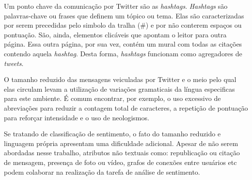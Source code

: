 Um ponto chave da comunicação por Twitter são as \textit{hashtags}.
\textit{Hashtags} são palavras-chave ou frases que definem um tópico ou tema.
Elas são caracterizadas por serem precedidas pelo simbolo da tralha (\#) e por não conterem espaços ou pontuação.
São, ainda, elementos clicáveis que apontam o leitor para outra página.
Essa outra página, por sua vez, contém um mural com todas as citações contendo aquela \textit{hashtag}.
Desta forma, \textit{hashtags} funcionam como agregadores de \textit{tweets}.

O tamanho reduzido das mensagens veiculadas por Twitter e o meio pelo qual elas circulam levam a utilização de
variações gramaticais da língua especificas para este ambiente.
É comum encontrar, por exemplo, o uso excessivo de abreviações para reduzir a contagem total de caracteres, a repetição
de pontuação para reforçar intensidade e o uso de neologismos.

Se tratando de classificação de sentimento, o fato do tamanho reduzido e linguagem própria apresentam uma dificuldade
adicional.
Apesar de não serem abordadas nesse trabalho, atributos não textuais como: republicação ou citação de mensagem, presença
de foto ou vídeo, grafos de conexões entre usuários etc podem colaborar na realização da tarefa de análise de sentimento.
